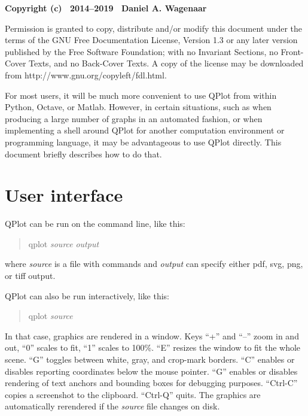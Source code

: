\documentclass[11pt]{article}
\begin{document}
\begin{centering}
\medskip

\bigskip

\end{centering}

{\noindent\scriptsize\bf  Copyright (c) ~2014--2019 ~Daniel A. Wagenaar
  
\noindent Permission is granted to copy, distribute and/or modify this document
under the terms of the GNU Free Documentation License, Version 1.3 or
any later version published by the Free Software Foundation; with no
Invariant Sections, no Front-Cover Texts, and no Back-Cover Texts.  A
copy of the license may be downloaded from
http://www.gnu.org/copyleft/fdl.html.}\bigskip


\noindent For most users, it will be much more convenient to use QPlot from
within Python, Octave, or Matlab. However, in certain situations, such as when
producing a large number of graphs in an automated fashion, or when
implementing a shell around QPlot for another computation environment
or programming language, it may be advantageous to use QPlot
directly. This document briefly describes how to do that.

\section{User interface}

QPlot can be run on the command line, like this:
\begin{quotation}
qplot \emph{source} \emph{output}
\end{quotation}
 where \emph{source} is a file with commands and
\emph{output} can specify either pdf, svg, png, or tiff output.

QPlot can also be run interactively, like this:
\begin{quotation}
qplot \emph{source}
\end{quotation}
In that case, graphics are rendered in a window. Keys ``+'' and ``--''
zoom in and out, ``0'' scales to fit, ``1'' scales to 100\%. ``E''
resizes the window to fit the whole scene. ``G'' toggles between
white, gray, and crop-mark borders. ``C'' enables or disables
reporting coordinates below the mouse pointer. ``G'' enables or
disables rendering of text anchors and bounding boxes for debugging
purposes.  ``Ctrl-C'' copies a screenshot to the clipboard. ``Ctrl-Q''
quits. The graphics are automatically rerendered if the \emph{source}
file changes on disk.
\end{document}
